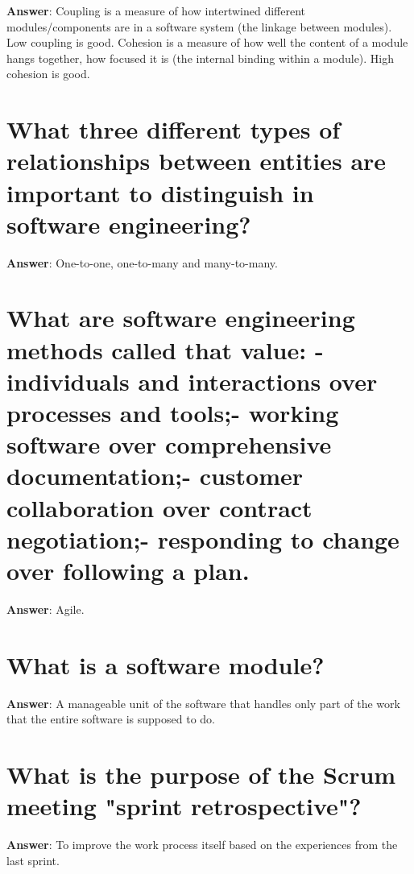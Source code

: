 \documentclass[a4paper,11pt,oneside]{book}
\begin{document}
\begin{sloppypar}
\label{q:239:sa:en:True}

\textbf{Answer}: Coupling is a measure of how intertwined different modules/components are in a software system (the linkage between modules). Low coupling is good. Cohesion is a measure of how well the content of a module hangs together, how focused it is (the internal binding within a module). High cohesion is good.



\section{What three different types of relationships between entities are important to distinguish in software engineering?}

\label{q:240:sa:en:True}

\textbf{Answer}: One-to-one, one-to-many and many-to-many.



\section{What are software engineering methods called that value: - individuals and interactions over processes and tools;- working software over comprehensive documentation;- customer collaboration over contract negotiation;- responding to change over following a plan.}

\label{q:241:sa:en:True}

\textbf{Answer}: Agile.



\section{What is a software module?}

\label{q:242:sa:en:True}

\textbf{Answer}: A manageable unit of the software that handles only part of the work that the entire software is supposed to do.



\section{What is the purpose of the Scrum meeting "sprint retrospective"?}

\label{q:243:sa:en:True}

\textbf{Answer}: To improve the work process itself based on the experiences from the last sprint.




\end{sloppypar}
\end{document}
